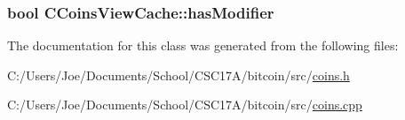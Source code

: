 \subsubsection[{has\+Modifier}]{\setlength{\rightskip}{0pt plus 5cm}bool C\+Coins\+View\+Cache\+::has\+Modifier\hspace{0.3cm}{\ttfamily [protected]}}\label{class_c_coins_view_cache_a363e27234d36bb0fc533d60cd64d1bc3}


The documentation for this class was generated from the following files\+:\begin{DoxyCompactItemize}
\item 
C\+:/\+Users/\+Joe/\+Documents/\+School/\+C\+S\+C17\+A/bitcoin/src/\hyperlink{coins_8h}{coins.\+h}\item 
C\+:/\+Users/\+Joe/\+Documents/\+School/\+C\+S\+C17\+A/bitcoin/src/\hyperlink{coins_8cpp}{coins.\+cpp}\end{DoxyCompactItemize}
